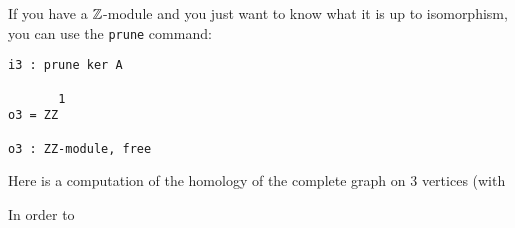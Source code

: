 If you have a $\mathbb{Z}$-module and you just want to know what it is
up to isomorphism, you can use the \texttt{prune} command:
\begin{verbatim}
i3 : prune ker A

       1
o3 = ZZ

o3 : ZZ-module, free
\end{verbatim}
Here is a computation of the homology of the complete graph
on 3 vertices (with 

In order to 


